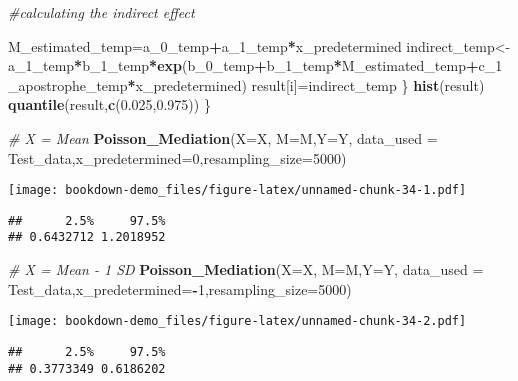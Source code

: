 \documentclass[]{book}
\newenvironment{Shaded}{\begin{snugshade}}{\end{snugshade}}
\newcommand{\CommentTok}[1]{\textcolor[rgb]{0.56,0.35,0.01}{\textit{#1}}}
\newcommand{\DataTypeTok}[1]{\textcolor[rgb]{0.13,0.29,0.53}{#1}}
\newcommand{\DecValTok}[1]{\textcolor[rgb]{0.00,0.00,0.81}{#1}}
\newcommand{\FloatTok}[1]{\textcolor[rgb]{0.00,0.00,0.81}{#1}}
\newcommand{\KeywordTok}[1]{\textcolor[rgb]{0.13,0.29,0.53}{\textbf{#1}}}
\newcommand{\NormalTok}[1]{#1}
\newcommand{\OperatorTok}[1]{\textcolor[rgb]{0.81,0.36,0.00}{\textbf{#1}}}
\begin{document}
\begin{Shaded}
\begin{Highlighting}[]
  \CommentTok{#calculating the indirect effect}
  
\NormalTok{  M_estimated_temp=a_}\DecValTok{0}\NormalTok{_temp}\OperatorTok{+}\NormalTok{a_}\DecValTok{1}\NormalTok{_temp}\OperatorTok{*}\NormalTok{x_predetermined}
\NormalTok{  indirect_temp<-a_}\DecValTok{1}\NormalTok{_temp}\OperatorTok{*}\NormalTok{b_}\DecValTok{1}\NormalTok{_temp}\OperatorTok{*}\KeywordTok{exp}\NormalTok{(b_}\DecValTok{0}\NormalTok{_temp}\OperatorTok{+}\NormalTok{b_}\DecValTok{1}\NormalTok{_temp}\OperatorTok{*}\NormalTok{M_estimated_temp}\OperatorTok{+}\NormalTok{c_}\DecValTok{1}\NormalTok{_apostrophe_temp}\OperatorTok{*}\NormalTok{x_predetermined)}
\NormalTok{  result[i]=indirect_temp}
\NormalTok{\}}
\KeywordTok{hist}\NormalTok{(result)}
\KeywordTok{quantile}\NormalTok{(result,}\KeywordTok{c}\NormalTok{(}\FloatTok{0.025}\NormalTok{,}\FloatTok{0.975}\NormalTok{))}
\NormalTok{\}}

\CommentTok{# X = Mean}
\KeywordTok{Poisson_Mediation}\NormalTok{(}\DataTypeTok{X=}\NormalTok{X, }\DataTypeTok{M=}\NormalTok{M,}\DataTypeTok{Y=}\NormalTok{Y, }\DataTypeTok{data_used =}\NormalTok{ Test_data,}\DataTypeTok{x_predetermined=}\DecValTok{0}\NormalTok{,}\DataTypeTok{resampling_size=}\DecValTok{5000}\NormalTok{)}
\end{Highlighting}
\end{Shaded}

\texttt{[image: bookdown-demo\_files/figure-latex/unnamed-chunk-34-1.pdf]}

\begin{verbatim}
##      2.5%     97.5% 
## 0.6432712 1.2018952
\end{verbatim}

\begin{Shaded}
\begin{Highlighting}[]
\CommentTok{# X = Mean - 1 SD}
\KeywordTok{Poisson_Mediation}\NormalTok{(}\DataTypeTok{X=}\NormalTok{X, }\DataTypeTok{M=}\NormalTok{M,}\DataTypeTok{Y=}\NormalTok{Y, }\DataTypeTok{data_used =}\NormalTok{ Test_data,}\DataTypeTok{x_predetermined=}\OperatorTok{-}\DecValTok{1}\NormalTok{,}\DataTypeTok{resampling_size=}\DecValTok{5000}\NormalTok{)}
\end{Highlighting}
\end{Shaded}

\texttt{[image: bookdown-demo\_files/figure-latex/unnamed-chunk-34-2.pdf]}

\begin{verbatim}
##      2.5%     97.5% 
## 0.3773349 0.6186202
\end{verbatim}
\end{document}
